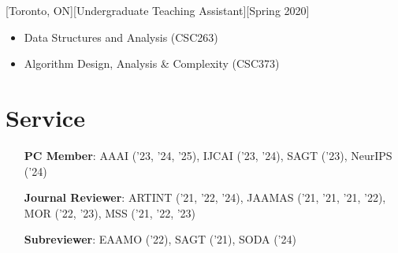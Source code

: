 \documentclass{article}
\begin{document}
    [Toronto, ON][Undergraduate Teaching Assistant][Spring 2020]
    \begin{itemize}
        \item Data Structures and Analysis (CSC263)
        \item Algorithm Design, Analysis \& Complexity (CSC373)
    \end{itemize}
    
    \section{Service}
    \begin{enumerate}[align=left]
    	\item[\textbf{PC Member}:] AAAI ('23, '24, '25), IJCAI ('23, '24), SAGT ('23), NeurIPS ('24)
    	\item[\textbf{Journal Reviewer}:] ARTINT ('21, '22, '24), JAAMAS ('21, '21, '21, '22), MOR ('22, '23), MSS ('21, '22, '23)
    	\item[\textbf{Subreviewer}:] EAAMO ('22), SAGT ('21), SODA ('24)
    \end{enumerate}
    
\end{document}
